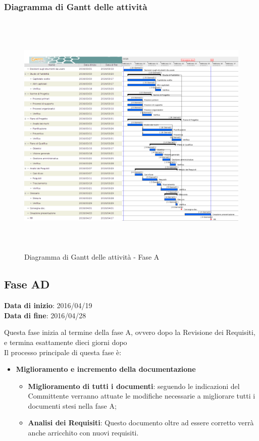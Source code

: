 		
		\subsubsection{Diagramma di Gantt delle attività}
		
		\begin{figure}[!h]
			\centering
			\includegraphics[height=12cm, width=15cm]{img/gantt/A} 
			\caption{Diagramma di Gantt delle attività - Fase A}
		\end{figure}
		
	\subsection{Fase AD}
	\begin{center}
		\textbf{Data di inizio}: 2016/04/19 \\
		\textbf{Data di fine}: 2016/04/28 \\
	\end{center}
	Questa fase inizia al termine della fase A, ovvero dopo la Revisione dei Requisiti, e termina esattamente dieci giorni dopo \\ 
	Il processo principale di questa fase è:
	\begin{itemize}
		\item \textbf{Miglioramento e incremento della documentazione}
		\att
		\begin{itemize}
			\item \textbf{Miglioramento di tutti i documenti}: seguendo le indicazioni del Committente verranno attuate le modifiche necessarie a migliorare tutti i documenti stesi nella fase A;
			\item \textbf{Analisi dei Requisiti}: Questo documento oltre ad essere corretto verrà anche arricchito con nuovi requisiti.
		\end{itemize}
	\end{itemize}
		
